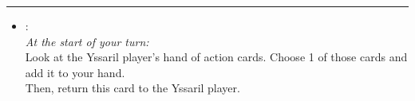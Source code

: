 \begin{multicols}{2}
\vspace{-10pt}\rule{\hsize}{0.4pt}\vspace{5pt}


\begin{itemize}
\item {}:\\
\emph{At the start of your turn:}\\
Look at the Yssaril player's hand of action cards. Choose 1 of those cards and add it to your hand.\\
Then, return this card to the Yssaril player.
\end{itemize}

\end{multicols}



